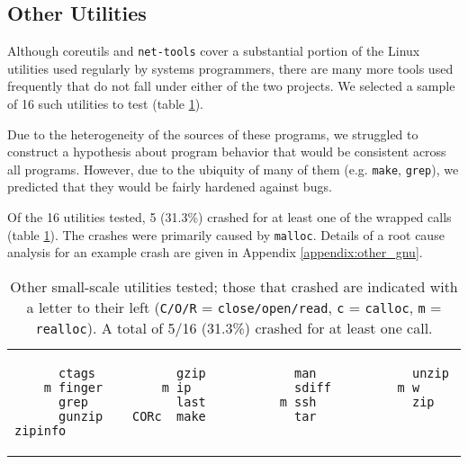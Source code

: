 \subsection{Other Utilities}
Although coreutils and \texttt{net-tools} cover a substantial portion of the Linux utilities used regularly by systems programmers, there are many more tools used frequently that do not fall under either of the two projects. We selected a sample of 16 such utilities to test (table \ref{lst:other_utilities}).

Due to the heterogeneity of the sources of these programs, we struggled to construct a hypothesis about program behavior that would be consistent across all programs. However, due to the ubiquity of many of them (e.g. \texttt{make}, \texttt{grep}), we predicted that they would be fairly hardened against bugs.

Of the 16 utilities tested, 5 (31.3\%) crashed for at least one of the wrapped calls (table \ref{lst:other_utilities}). The crashes were primarily caused by \texttt{malloc}. Details of a root cause analysis for an example crash are given in Appendix \ref{appendix:other_gnu}.

\begin{table}[h]
\begin{tabular}{l}
\begin{lstlisting}
      ctags           gzip            man             unzip
    m finger        m ip              sdiff         m w
      grep            last          m ssh             zip
      gunzip    CORc  make            tar             zipinfo
\end{lstlisting}
\end{tabular}
\caption{Other small-scale utilities tested; those that crashed are indicated with a letter to their left (\texttt{C/O/R} = \texttt{close/open/read}, \texttt{c} = \texttt{calloc}, \texttt{m} = \texttt{realloc}). A total of 5/16 (31.3\%) crashed for at least one call.}
\label{lst:other_utilities}
\end{table}